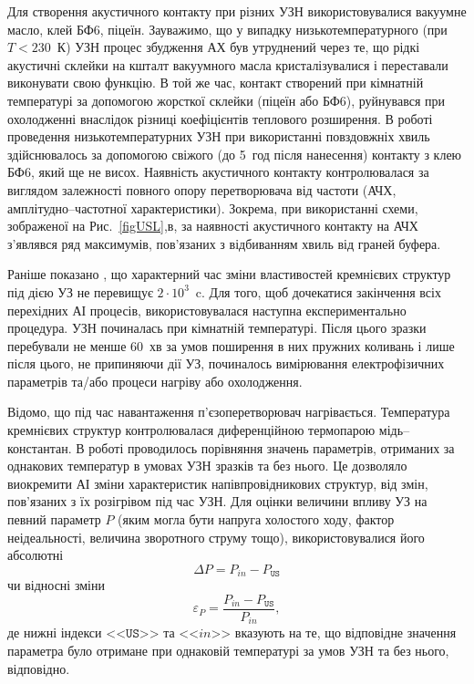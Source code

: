Для створення акустичного контакту при різних УЗН використовувалися вакуумне масло, клей БФ6, піцеїн.
Зауважимо, що у випадку низькотемпературного (при $T<230$~К) УЗН процес збудження АХ був утруднений через те, що
рідкі акустичні склейки на кшталт вакуумного масла кристалізувалися і переставали виконувати свою функцію.
В той же час, контакт створений при кімнатній температурі за допомогою жорсткої склейки (піцеїн або БФ6),
руйнувався при охолодженні внаслідок різниці коефіцієнтів теплового розширення.
В роботі проведення низькотемпературних УЗН при використанні повздовжніх хвиль здійснювалось за допомогою свіжого (до 5~год після нанесення) контакту з клею БФ6, який ще не висох.
Наявність акустичного контакту контролювалася за виглядом залежності повного опору перетворювача від частоти (АЧХ, амплітудно--частотної характеристики).
Зокрема, при використанні схеми, зображеної на Рис.~\ref{figUSL},в, за наявності акустичного контакту на АЧХ з'являвся ряд максимумів, пов'язаних з відбиванням хвиль від граней буфера.


Раніше показано \cite{Ostapenko1995,YOlikhTPL2011,Ostrovskii2001}, що характерний час зміни властивостей кремнієвих структур під дією УЗ не перевищує $2\cdot10^3$~c.
Для того, щоб дочекатися закінчення всіх перехідних АІ процесів, використовувалася наступна експериментально процедура.
УЗН починалась при кімнатній температурі.
Після цього зразки перебували не менше 60~хв за умов поширення в них пружних коливань і лише після цього, не припиняючи дії УЗ, починалось вимірювання електрофізичних параметрів та/або процеси нагріву або охолодження.

Відомо, що під час навантаження п'єзоперетворювач нагрівається.
Температура кремнієвих структур контролювалася диференційною термопарою мідь--константан.
В роботі проводилось порівняння значень параметрів, отриманих за однакових температур в умовах УЗН зразків та без нього.
Це дозволяло виокремити АІ зміни характеристик напівпровідникових структур, від змін, пов'язаних з їх розігрівом під час УЗН.
Для оцінки величини впливу УЗ на певний параметр $P$ (яким могла бути напруга холостого ходу, фактор неідеальності, величина зворотного струму тощо),
використовувалися його абсолютні
 \begin{equation}
 \label{eqAbsDelta}
\Delta P=P_{in}-P_\mathtt{US}
 \end{equation}
чи відносні зміни
 \begin{equation}
 \label{eqEpsDelta}
\varepsilon_P=\frac{P_{in}-P_\mathtt{US}}{P_{in}},
 \end{equation}
де нижні індекси <<$\mathtt{US}$>> та <<$in$>> вказують на те, що відповідне значення параметра було отримане при однаковій температурі за умов УЗН та без нього, відповідно.

